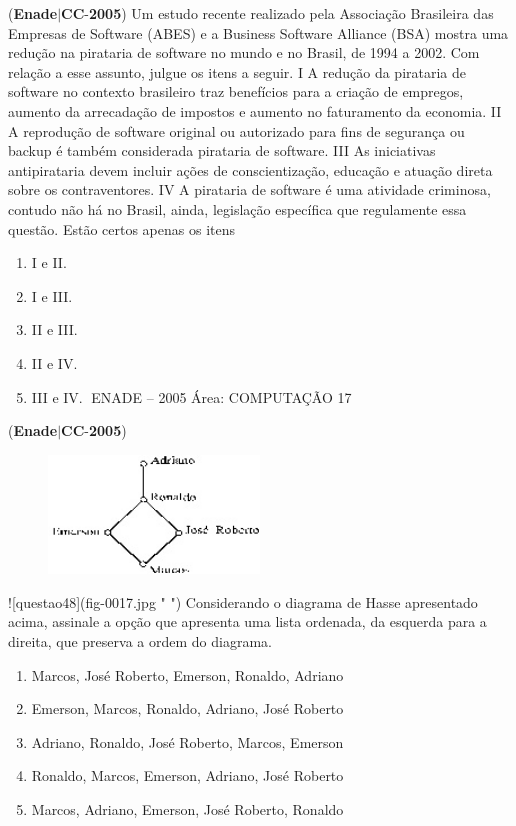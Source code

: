 \documentclass{exam}
\begin{document}
\begin{questions}
\question (\textbf{Enade}$|$\textbf{CC}-\textbf{2005}) Um estudo recente realizado pela Associação Brasileira das
Empresas de Software (ABES) e a Business Software Alliance
(BSA) mostra uma redução na pirataria de software no mundo e no
Brasil, de 1994 a 2002. Com relação a esse assunto, julgue os itens
a seguir.
I A redução da pirataria de software no contexto brasileiro traz
benefícios para a criação de empregos, aumento da arrecadação
de impostos e aumento no faturamento da economia.
II A reprodução de software original ou autorizado para fins de
segurança ou backup é também considerada pirataria de
software.
III As iniciativas antipirataria devem incluir ações de
conscientização, educação e atuação direta sobre os
contraventores.
IV A pirataria de software é uma atividade criminosa, contudo não
há no Brasil, ainda, legislação específica que regulamente essa
questão.
Estão certos apenas os itens
	\begin{enumerate}[label=\alph*)]
		\item  I e II.
		\item  I e III.
		\item  II e III.
		\item  II e IV.
		\item  III e IV.
ENADE – 2005 Área: COMPUTAÇÃO 17

	\end{enumerate}

\question (\textbf{Enade}$|$\textbf{CC}-\textbf{2005}) \begin{figure}[H]
	\begin{center}
		\includegraphics[width=0.5\textwidth]{CIENCIA_DA_COMPUTACAO_Prova2005-utf8_figuras/fig-0017.jpg}
		\caption{ }
	\end{center}
\end{figure}
![questao48](fig-0017.jpg " ")
Considerando o diagrama de Hasse apresentado acima,
assinale a opção que apresenta uma lista ordenada, da
esquerda para a direita, que preserva a ordem do diagrama.
	\begin{enumerate}[label=\alph*)]
		\item  Marcos, José Roberto, Emerson, Ronaldo, Adriano
		\item  Emerson, Marcos, Ronaldo, Adriano, José Roberto
		\item  Adriano, Ronaldo, José Roberto, Marcos, Emerson
		\item  Ronaldo, Marcos, Emerson, Adriano, José Roberto
		\item  Marcos, Adriano, Emerson, José Roberto, Ronaldo


\end{enumerate}
\end{questions}
\end{document}
